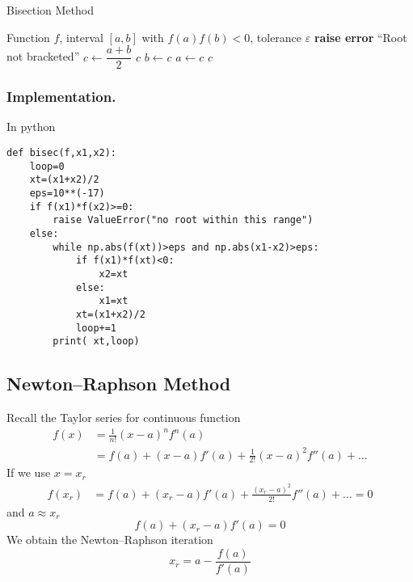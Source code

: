 \documentclass[../../../main.tex]{subfiles}
\begin{document}
\begin{algorithm}
\caption{Bisection Method}
\begin{algorithmic}
\REQUIRE Function $f$, interval $[a,b]$ with $f(a)f(b)<0$, tolerance $\varepsilon$
    \STATE \textbf{raise error} ``Root not bracketed''
\ENDIF
\REPEAT
    \STATE $c \gets \dfrac{a+b}{2}$
        \RETURN $c$
    \ENDIF
        \STATE $b \gets c$
    \ELSE
        \STATE $a \gets c$
    \ENDIF
{}
\RETURN $c$
\end{algorithmic}
\end{algorithm}

\subsubsection{Implementation.}
In python

\begin{verbatim}
def bisec(f,x1,x2):
    loop=0
    xt=(x1+x2)/2
    eps=10**(-17)
    if f(x1)*f(x2)>=0:
        raise ValueError("no root within this range")
    else:
        while np.abs(f(xt))>eps and np.abs(x1-x2)>eps:
            if f(x1)*f(xt)<0:
                x2=xt 
            else:
                x1=xt 
            xt=(x1+x2)/2
            loop+=1
        print( xt,loop)
\end{verbatim}

\subsection{Newton–Raphson Method}
Recall the Taylor series for continuous function
\begin{align*}
    f(x) & =         \frac{1}{n!}(x-a)^n f^{n}(a)              \\
         & =   f(a)+(x-a)f'(a)+\frac{1}{2!}(x-a)^2f''(a)+\dots
\end{align*}
If we use $x=x_r$
\begin{align*}
    f(x_r) & =  f(a)+(x_r-a)f'(a)+\frac{(x_r-a)^2}{2!}f''(a)+\dots=0
\end{align*}
and $a \approx x_r$
\begin{equation*}
    f(a)+(x_r-a)f'(a)=0
\end{equation*}
We obtain the Newton–Raphson iteration
\begin{equation*}
    x_r=a-\frac{f(a )}{f'(a)}
\end{equation*}
\end{document}
